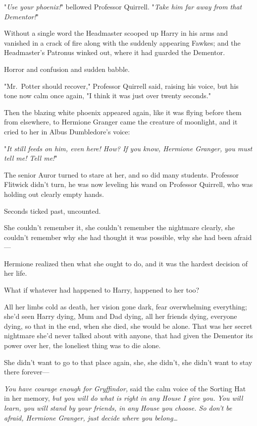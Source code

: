 "\emph{Use your phoenix!}" bellowed Professor Quirrell. "\emph{Take him far 
away from that Dementor!}"

Without a single word the Headmaster scooped up Harry in his arms and vanished 
in a crack of fire along with the suddenly appearing Fawkes; and the 
Headmaster's Patronus winked out, where it had guarded the Dementor.

Horror and confusion and sudden babble.

"Mr.~Potter should recover," Professor Quirrell said, raising his voice, but 
his tone now calm once again, "I think it was just over twenty seconds."

Then the blazing white phoenix appeared again, like it was flying before them 
from elsewhere, to Hermione Granger came the creature of moonlight, and it 
cried to her in Albus Dumbledore's voice:

"\emph{It still feeds on him, even here! How? If you know, Hermione Granger, 
you must tell me! Tell me!}"

The senior Auror turned to stare at her, and so did many students. Professor 
Flitwick didn't turn, he was now leveling his wand on Professor Quirrell, who 
was holding out clearly empty hands.

Seconds ticked past, uncounted.

She couldn't remember it, she couldn't remember the nightmare clearly, she 
couldn't remember why she had thought it was possible, why she had been 
afraid---

Hermione realized then what she ought to do, and it was the hardest decision of 
her life.

What if whatever had happened to Harry, happened to her too?

All her limbs cold as death, her vision gone dark, fear overwhelming 
everything; she'd seen Harry dying, Mum and Dad dying, all her friends dying, 
everyone dying, so that in the end, when she died, she would be alone. That was 
her secret nightmare she'd never talked about with anyone, that had given the 
Dementor its power over her, the loneliest thing was to die alone.

She didn't want to go to that place again, she, she didn't, she didn't want to 
stay there forever---

\emph{You have courage enough for Gryffindor,} said the calm voice of the 
Sorting Hat in her memory, \emph{but you will do what is right in any House I 
give you. You will learn, you will stand by your friends, in any House you 
choose. So don't be afraid, Hermione Granger, just decide where you 
belong{\ldots}}


